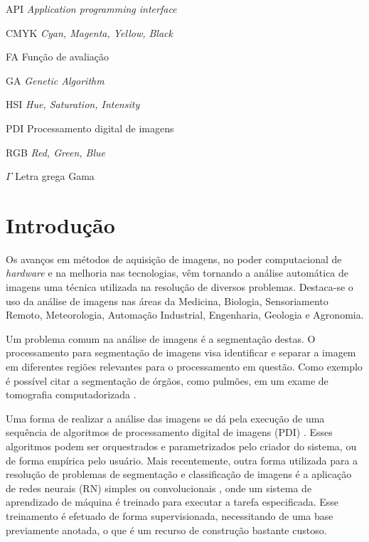 \documentclass[12pt,oneside,a4paper,english,french,spanish,brazil,]{abntex2}
\begin{document}
\listoffigures*
\cleardoublepage
{}
\listoftables*
\cleardoublepage
\begin{siglas}
  \item[API] \textit{Application programming interface}
  \item[CMYK] \textit{Cyan, Magenta, Yellow, Black}
  \item[FA] Função de avaliação
  \item[GA] \textit{Genetic Algorithm}
  \item[HSI] \textit{Hue, Saturation, Intensity}
  \item[PDI] Processamento digital de imagens
  \item[RGB] \textit{Red, Green, Blue}
\end{siglas}
\begin{simbolos}
  \item[$ \Gamma $] Letra grega Gama
\end{simbolos}
\tableofcontents*
\cleardoublepage
\textual
\chapter{Introdução}
\label{chap:Introducao}

Os avanços em métodos de aquisição de imagens, no poder computacional de \textit{hardware} e na melhoria nas tecnologias, vêm tornando a análise automática de imagens uma técnica utilizada na resolução de diversos problemas. Destaca-se o uso da análise de imagens nas áreas da Medicina, Biologia, Sensoriamento Remoto, Meteorologia, Automação Industrial, Engenharia, Geologia e Agronomia.  

Um problema comum na análise de imagens é a segmentação destas. O processamento para segmentação de imagens visa identificar e separar a imagem em diferentes regiões relevantes para o processamento em questão. Como exemplo é possível citar a segmentação de órgãos, como pulmões, em um exame de tomografia computadorizada \cite{ronnau:2015}.

Uma forma de realizar a análise das imagens se dá pela execução de uma sequência de algoritmos de processamento digital de imagens (PDI) \cite{gonzalez:2012}. Esses algoritmos podem ser orquestrados e parametrizados pelo criador do sistema, ou de forma empírica pelo usuário. Mais recentemente, outra forma utilizada para a resolução de problemas de segmentação e classificação de imagens é a aplicação de redes neurais (RN) simples ou convolucionais \cite{noh:2015}, onde um sistema de aprendizado de máquina é treinado para executar a tarefa especificada. Esse treinamento é efetuado de forma supervisionada, necessitando de uma base previamente anotada, o que é um recurso de construção bastante custoso.
\end{document}
